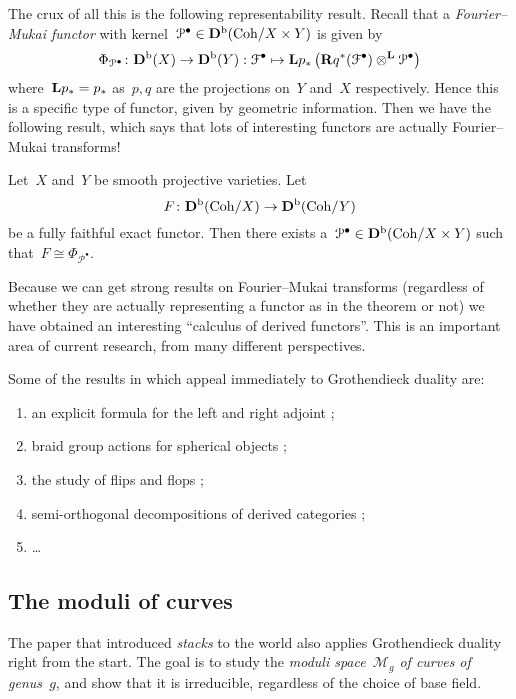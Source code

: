 \documentclass[10pt,a4paper]{article}
\begin{document}
The crux of all this is the following representability result. Recall that a \emph{Fourier--Mukai functor} with kernel~$\mathcal{P}^\bullet\in\mathbf{D}^{\mathrm{b}}(\mathrm{Coh}/X\times Y)$ is given by
\begin{equation}
  \Phi_{\mathcal{P}^\bullet}\colon\mathbf{D}^{\mathrm{b}}(X)\to\mathbf{D}^{\mathrm{b}}(Y):\mathcal{F}^\bullet\mapsto\mathbf{L} p_*\left( \mathbf{R} q^*(\mathcal{F}^\bullet)\otimes^{\mathbf{L}}\mathcal{P}^\bullet \right)
\end{equation}
where~$\mathbf{L} p_*=p_*$ as~$p,q$ are the projections on~$Y$ and~$X$ respectively. Hence this is a specific type of functor, given by geometric information. Then we have the following result, which says that lots of interesting functors are actually Fourier--Mukai transforms!
\begin{theorem}
  \label{theorem:bondal-orlov}
  Let~$X$ and~$Y$ be smooth projective varieties. Let
  \begin{equation}
    F\colon\mathbf{D}^{\mathrm{b}}(\mathrm{Coh}/X)\to\mathbf{D}^{\mathrm{b}}(\mathrm{Coh}/Y)
  \end{equation}
  be a fully faithful exact functor. Then there exists a~$\mathcal{P}^\bullet\in\mathbf{D}^{\mathrm{b}}(\mathrm{Coh}/X\times Y)$ such that~$F\cong\Phi_{\mathcal{P}^\bullet}$.
\end{theorem}
Because we can get strong results on Fourier--Mukai transforms (regardless of whether they are actually representing a functor as in the theorem or not) we have obtained an interesting ``calculus of derived functors''. This is an important area of current research, from many different perspectives.

Some of the results in \cite{huybrechts-fourier-mukai-transforms} which appeal immediately to Grothendieck duality are:
\begin{enumerate}
  \item an explicit formula for the left and right adjoint \cite[proposition 5.9]{huybrechts-fourier-mukai-transforms};
  \item braid group actions for spherical objects \cite[lemma 8.21]{huybrechts-fourier-mukai-transforms};
  \item the study of flips and flops \cite[\S 11.1]{huybrechts-fourier-mukai-transforms};
  \item semi-orthogonal decompositions of derived categories \cite[\S 11.2]{huybrechts-fourier-mukai-transforms};
  \item \ldots
\end{enumerate}


\subsection{The moduli of curves}
The paper that introduced \emph{stacks} to the world \cite{deligne-mumford-irreducibility-moduli-of-curves} also applies Grothendieck duality right from the start. The goal is to study the \emph{moduli space~$\mathcal{M}_g$ of curves of genus~$g$}, and show that it is irreducible, regardless of the choice of base field.
\end{document}
